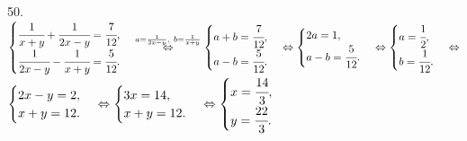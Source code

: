 50. $\begin{cases} \cfrac{1}{x+y}+\cfrac{1}{2x-y}=\cfrac{7}{12},\\
\cfrac{1}{2x-y}-\cfrac{1}{x+y}=\cfrac{5}{12}.\end{cases} \stackrel{a=\frac{1}{2x-y},\ b=\frac{1}{x+y}}{\Leftrightarrow}
\begin{cases} a+b=\cfrac{7}{12},\\
a-b=\cfrac{5}{12}.\end{cases}\Leftrightarrow \begin{cases} 2a=1,\\
a-b=\cfrac{5}{12}.\end{cases}\Leftrightarrow \begin{cases} a=\cfrac{1}{2},\\
b=\cfrac{1}{12}.\end{cases}\Leftrightarrow$\\$
\begin{cases} 2x-y=2,\\
x+y=12.\end{cases}\Leftrightarrow
\begin{cases} 3x=14,\\
x+y=12.\end{cases}\Leftrightarrow
\begin{cases} x=\cfrac{14}{3},\\
y=\cfrac{22}{3}.\end{cases}$\\
